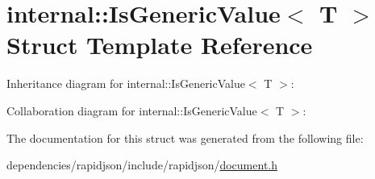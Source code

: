 \hypertarget{structinternal_1_1_is_generic_value}{}\section{internal\+:\+:Is\+Generic\+Value$<$ T $>$ Struct Template Reference}
\label{structinternal_1_1_is_generic_value}


Inheritance diagram for internal\+:\+:Is\+Generic\+Value$<$ T $>$\+:


Collaboration diagram for internal\+:\+:Is\+Generic\+Value$<$ T $>$\+:


The documentation for this struct was generated from the following file\+:\begin{DoxyCompactItemize}
\item 
dependencies/rapidjson/include/rapidjson/\hyperlink{document_8h}{document.\+h}\end{DoxyCompactItemize}
